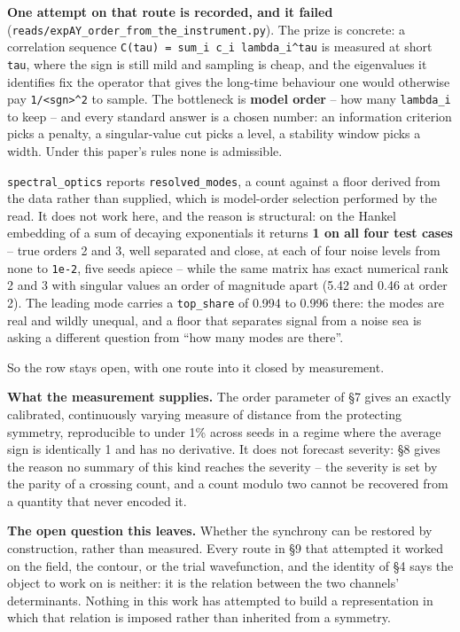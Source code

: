 \documentclass[10pt,letterpaper,twocolumn]{article}
\begin{document}
\textbf{One attempt on that route is recorded, and it failed} (\texttt{reads/\allowbreak{}expAY\_\allowbreak{}order\_\allowbreak{}from\_\allowbreak{}the\_\allowbreak{}instrument.\allowbreak{}py}).
The prize is concrete: a correlation sequence \texttt{C(\allowbreak{}tau)\allowbreak{}\ =\allowbreak{}\ sum\_\allowbreak{}i\ c\_\allowbreak{}i\ lambda\_\allowbreak{}i\^{}tau} is measured at short
\texttt{tau}, where the sign is still mild and sampling is cheap, and the eigenvalues it identifies fix the
operator that gives the long-time behaviour one would otherwise pay \texttt{1/\allowbreak{}\textless{}\allowbreak{}sgn\textgreater{}\allowbreak{}\^{}2} to sample. The
bottleneck is \textbf{model order} -- how many \texttt{lambda\_\allowbreak{}i} to keep -- and every standard answer is a
chosen number: an information criterion picks a penalty, a singular-value cut picks a level, a
stability window picks a width. Under this paper's rules none is admissible.

\texttt{spectral\_\allowbreak{}optics} reports \texttt{resolved\_\allowbreak{}modes}, a count against a floor derived from the data rather
than supplied, which is model-order selection performed by the read. It does not work here, and
the reason is structural: on the Hankel embedding of a sum of decaying
exponentials it returns \textbf{1 on all four test cases} -- true orders 2 and 3, well separated and
close, at each of four noise levels from none to \texttt{1e-{}\allowbreak{}2}, five seeds apiece -- while the same matrix
has exact numerical rank 2 and 3 with singular values an order of magnitude apart (5.42 and 0.46 at
order 2). The leading mode carries a \texttt{top\_\allowbreak{}share} of 0.994 to 0.996 there:
the modes are real and wildly unequal, and a floor that separates signal from a noise sea is asking
a different question from ``how many modes are there''.

So the row stays open, with one route into it closed by measurement.

\textbf{What the measurement supplies.} The order parameter of §7 gives an exactly
calibrated, continuously varying measure of distance from the protecting symmetry, reproducible to
under 1\% across seeds in a regime where the average sign is identically 1 and has no derivative.
It does not forecast severity: §8 gives the
reason no summary of this kind reaches the severity -- the severity is set by the parity of a
crossing count, and a count modulo two cannot be recovered from a quantity that never encoded it.

\textbf{The open question this leaves.} Whether the synchrony can be restored by construction, rather
than measured. Every route in §9 that attempted it worked on the field, the contour, or the trial
wavefunction, and the identity of §4 says the object to work on is neither: it is the relation
between the two channels' determinants. Nothing in this work has attempted to build a
representation in which that relation is imposed rather than inherited from a symmetry.
\end{document}

